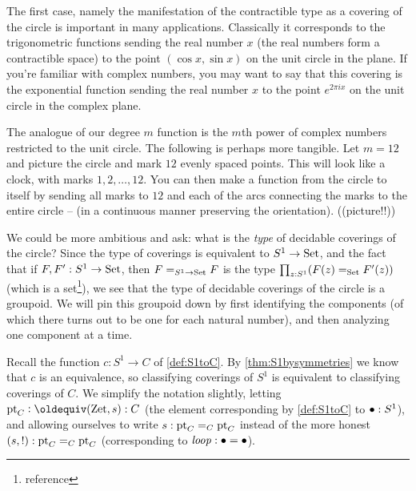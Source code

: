 \begin{remark}
  \label{rem:RtoS1}
  The first case, namely the manifestation of the contractible type as a covering of the circle is important in many applications.  Classically it corresponds to the trigonometric functions sending the real number $x$ (the real numbers form a contractible space) to the point $(\cos x,\sin x)$ on the unit circle in the plane.  If you're familiar with complex numbers, you may want to say that this covering is the exponential function sending the real number $x$ to the point $e^{2\pi ix}$ on the unit circle in the complex plane.

  \label{rem:finitecoveringsofS1}
  The analogue of our degree $m$ function is the $m$th power of complex numbers restricted to the unit circle.  The following is perhaps more tangible.  Let $m=12$ and picture the circle and mark $12$ evenly spaced points.  This will look like a clock, with marks $1,2,\dots,12$.  You can then make a function from the circle to itself by sending all marks to $12$ and each of the arcs connecting the marks to the entire circle -- (in a continuous manner preserving the orientation).
  ((picture!!))
\end{remark}

We could be more ambitious and ask: what is the \emph{type} of decidable coverings of the circle?  Since the type of coverings is equivalent to $S^1\to \mathord{\mathrm{Set}}$, and the fact that if $F,F':S^1\to\mathord{\mathrm{Set}}$, then $F=_{S^1\to\mathord{\mathrm{Set}}}F$ is the type $\prod_{z:S^1}(F(z)=_{\mathord{\mathrm{Set}}}F'(z))$ (which is a set\footnote{reference}), we see that the type of decidable coverings of the circle is a groupoid.  We will pin this groupoid down by first identifying the components (of which there turns out to be one for each natural number), and then analyzing one component at a time.

 Recall the function $c:S^1\to C$ of \cref{def:S1toC}.  By \cref{thm:S1bysymmetries} we know that $c$ is an equivalence, so classifying coverings of $S^1$ is equivalent to classifying coverings of $C$.  
We simplify the notation slightly, letting $\pt_C\defequi(\zet,s):C$ (the element corresponding by \cref{def:S1toC} to $\bullet:S^1$), and allowing ourselves to write $s:{\mathord{\mathrm{pt}}}_C=_C{\mathord{\mathrm{pt}}}_C$ instead of the more honest $(s,!):{\mathord{\mathrm{pt}}}_C=_C{\mathord{\mathrm{pt}}}_C$ (corresponding to $\mathit{loop}:\bullet=\bullet$).


